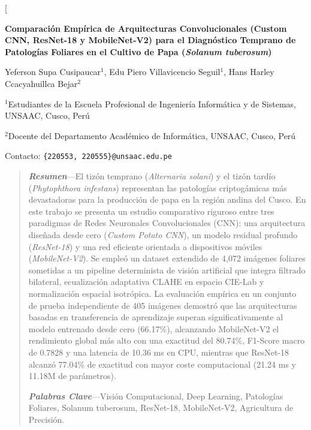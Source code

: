 \documentclass[10pt,a4paper,twoside]{article}
\begin{document}
\twocolumn[
  \begin{center}
    {\LARGE \bfseries Comparación Empírica de Arquitecturas Convolucionales (Custom CNN, ResNet-18 y MobileNet-V2) para el Diagnóstico Temprano de Patologías Foliares en el Cultivo de Papa (\textit{Solanum tuberosum}) \par}
    \vspace{0.4cm}
    {\large Yeferson Supa Cusipaucar$^1$, Edu Piero Villavicencio Seguil$^1$, Hans Harley Ccacyahuillca Bejar$^2$ \par}
    \vspace{0.2cm}
    {\small $^1$Estudiantes de la Escuela Profesional de Ingeniería Informática y de Sistemas, UNSAAC, Cusco, Perú \par}
    {\small $^2$Docente del Departamento Académico de Informática, UNSAAC, Cusco, Perú \par}
    {\small Contacto: \texttt{\{220553, 220555\}@unsaac.edu.pe} \par}
    \vspace{0.5cm}
  \end{center}

  \begin{quotation}
    \noindent \textbf{\textit{Resumen}}---El tizón temprano (\textit{Alternaria solani}) y el tizón tardío (\textit{Phytophthora infestans}) representan las patologías criptogámicas más devastadoras para la producción de papa en la región andina del Cusco. En este trabajo se presenta un estudio comparativo riguroso entre tres paradigmas de Redes Neuronales Convolucionales (CNN): una arquitectura diseñada desde cero (\textit{Custom Potato CNN}), un modelo residual profundo (\textit{ResNet-18}) y una red eficiente orientada a dispositivos móviles (\textit{MobileNet-V2}). Se empleó un dataset extendido de 4,072 imágenes foliares sometidas a un pipeline determinista de visión artificial que integra filtrado bilateral, ecualización adaptativa CLAHE en espacio CIE-Lab y normalización espacial isotrópica. La evaluación empírica en un conjunto de prueba independiente de 405 imágenes demostró que las arquitecturas basadas en transferencia de aprendizaje superan significativamente al modelo entrenado desde cero (66.17\%), alcanzando MobileNet-V2 el rendimiento global más alto con una exactitud del 80.74\%, F1-Score macro de 0.7828 y una latencia de 10.36 ms en CPU, mientras que ResNet-18 alcanzó 77.04\% de exactitud con mayor coste computacional (21.24 ms y 11.18M de parámetros).
    
    \vspace{0.2cm}
    \noindent \textbf{\textit{Palabras Clave}}---Visión Computacional, Deep Learning, Patologías Foliares, Solanum tuberosum, ResNet-18, MobileNet-V2, Agricultura de Precisión.
  \end{quotation}
\end{document}
